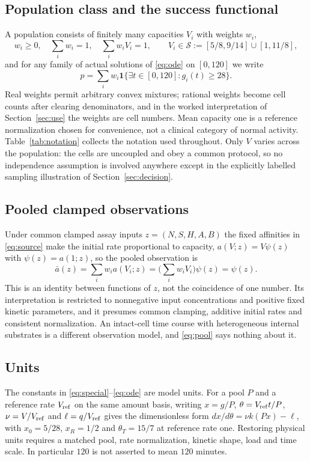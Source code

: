 \documentclass[11pt]{article}
\theoremstyle{definition}
\newcommand{\ind}{\mathbf 1}
\begin{document}
\subsection{Population class and the success functional}
A population consists of finitely many capacities $V_i$ with weights $w_i$,
\begin{equation}\label{eq:class}
  w_i\ge0,\quad \sum_iw_i=1,\quad \sum_iw_iV_i=1,\qquad
  V_i\in\mathcal S:=[5/8,9/14]\cup[1,11/8],
\end{equation}
and for any family of actual solutions of \eqref{eq:ode} on $[0,120]$ we write
\begin{equation}\label{eq:success}
  p=\sum_i w_i\ind\{\exists t\in[0,120]:g_i(t)\ge28\}.
\end{equation}
Real weights permit arbitrary convex mixtures; rational weights become cell
counts after clearing denominators, and in the worked interpretation of
Section~\ref{sec:use} the weights are cell numbers. Mean capacity one is a
reference normalization chosen for convenience, not a clinical category of
normal activity. Table~\ref{tab:notation} collects the notation used throughout.
Only $V$ varies across the population: the cells are
uncoupled and obey a common protocol, so no independence assumption is
involved anywhere except in the explicitly labelled sampling illustration of
Section~\ref{sec:decision}.

\subsection{Pooled clamped observations}
Under common clamped assay inputs $z=(N,S,H,A,B)$ the fixed affinities in
\eqref{eq:source} make the initial rate proportional to capacity,
$a(V;z)=V\psi(z)$ with $\psi(z)=a(1;z)$, so the pooled observation is
\begin{equation}\label{eq:pool}
  \bar a(z)=\sum_iw_ia(V_i;z)=\Big(\sum_iw_iV_i\Big)\psi(z)=\psi(z).
\end{equation}
This is an identity between functions of $z$, not the coincidence of one
number. Its interpretation is restricted to nonnegative input concentrations
and positive fixed kinetic parameters, and it presumes common clamping,
additive initial rates and consistent normalization. An intact-cell time
course with heterogeneous internal substrates is a different observation
model, and \eqref{eq:pool} says nothing about it.

\subsection{Units}
The constants in \eqref{eq:special}--\eqref{eq:ode} are model units. For a
pool $P$ and a reference rate $V_{\rm ref}$ on the same amount basis, writing
$x=g/P$, $\theta=V_{\rm ref}t/P$, $\nu=V/V_{\rm ref}$ and $\ell=q/V_{\rm ref}$
gives the dimensionless form $dx/d\theta=\nu k(Px)-\ell$, with $x_0=5/28$,
$x_R=1/2$ and $\theta_T=15/7$ at reference rate one. Restoring physical units
requires a matched pool, rate normalization, kinetic shape, load and time
scale. In particular $120$ is not asserted to mean $120$ minutes.
\end{document}
